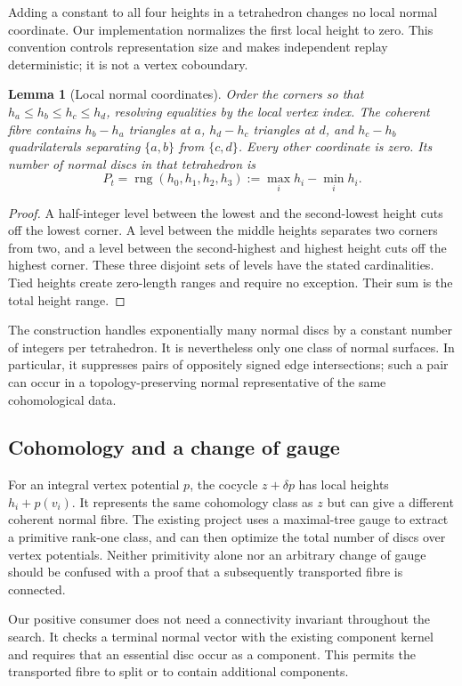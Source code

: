 \documentclass[11pt,letterpaper]{article}
\newtheorem{lemma}[theorem]{Lemma}
\theoremstyle{definition}
\theoremstyle{remark}
\newcommand{\rng}{\operatorname{rng}}
\begin{document}
Adding a constant to all four heights in a tetrahedron changes no local
normal coordinate. Our implementation normalizes the first local height to
zero. This convention controls representation size and makes independent
replay deterministic; it is not a vertex coboundary.

\begin{lemma}[Local normal coordinates]
\label{lem:local-coordinates}
Order the corners so that $h_a\le h_b\le h_c\le h_d$, resolving equalities
by the local vertex index. The coherent fibre contains
$h_b-h_a$ triangles at $a$, $h_d-h_c$ triangles at $d$, and
$h_c-h_b$ quadrilaterals separating $\{a,b\}$ from $\{c,d\}$.
Every other coordinate is zero. Its number of normal discs in that
tetrahedron is
\[
 P_t=\rng(h_0,h_1,h_2,h_3):=\max_i h_i-\min_i h_i.
\]
\end{lemma}
\begin{proof}
A half-integer level between the lowest and the second-lowest height cuts
off the lowest corner. A level between the middle heights separates two
corners from two, and a level between the second-highest and highest
height cuts off the highest corner. These three disjoint sets of levels
have the stated cardinalities. Tied heights create zero-length ranges and
require no exception. Their sum is the total height range.
\end{proof}

The construction handles exponentially many normal discs by a constant
number of integers per tetrahedron. It is nevertheless only one class of
normal surfaces. In particular, it suppresses pairs of oppositely signed
edge intersections; such a pair can occur in a topology-preserving normal
representative of the same cohomological data.

\subsection{Cohomology and a change of gauge}

For an integral vertex potential $p$, the cocycle $z+\delta p$ has local
heights $h_i+p(v_i)$. It represents the same cohomology class as $z$ but can
give a different coherent normal fibre. The existing project uses a
maximal-tree gauge to extract a primitive rank-one class, and can then
optimize the total number of discs over vertex potentials. Neither
primitivity alone nor an arbitrary change of gauge should be confused with
a proof that a subsequently transported fibre is connected.

Our positive consumer does not need a connectivity invariant throughout the
search. It checks a terminal normal vector with the existing component
kernel and requires that an essential disc occur as a component. This
permits the transported fibre to split or to contain additional components.
\end{document}
